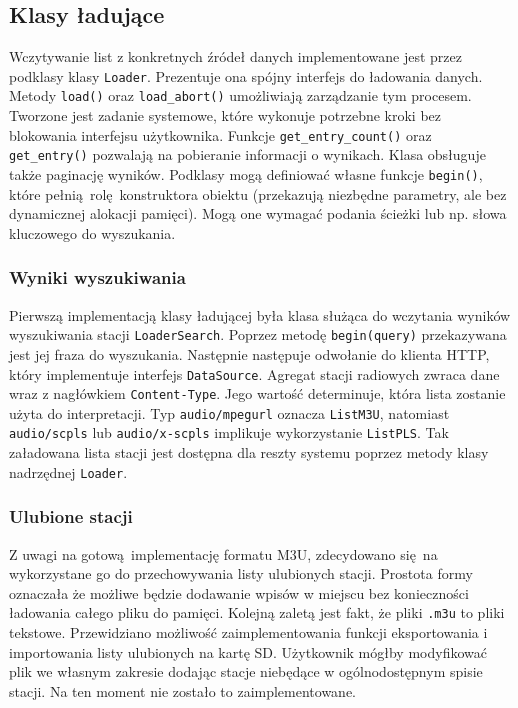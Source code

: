 \documentclass[polish]{aghengthesis}
\begin{document}
			
		\subsection{Klasy ładujące}
			Wczytywanie list z konkretnych źródeł danych implementowane jest przez podklasy klasy \lstinline|Loader|. Prezentuje ona spójny interfejs do ładowania danych. Metody \lstinline|load()| oraz \lstinline|load_abort()| umożliwiają zarządzanie tym procesem. Tworzone jest zadanie systemowe, które wykonuje potrzebne kroki bez blokowania interfejsu użytkownika. Funkcje \lstinline|get_entry_count()| oraz \lstinline|get_entry()| pozwalają na pobieranie informacji o wynikach. Klasa obsługuje także paginację wyników. Podklasy mogą definiować własne funkcje \lstinline|begin()|, które pełnią rolę konstruktora obiektu (przekazują niezbędne parametry, ale bez dynamicznej alokacji pamięci). Mogą one wymagać podania ścieżki lub np. słowa kluczowego do wyszukania.
			
			\subsubsection{Wyniki wyszukiwania}
				Pierwszą implementacją klasy ładującej była klasa służąca do wczytania wyników wyszukiwania stacji \lstinline|LoaderSearch|. Poprzez metodę \lstinline|begin(query)| przekazywana jest jej fraza do wyszukania. Następnie następuje odwołanie do klienta HTTP, który implementuje interfejs \lstinline|DataSource|. Agregat stacji radiowych zwraca dane wraz z nagłówkiem \lstinline|Content-Type|. Jego wartość determinuje, która lista zostanie użyta do interpretacji. Typ \lstinline|audio/mpegurl| oznacza \lstinline|ListM3U|, natomiast \lstinline|audio/scpls| lub \lstinline|audio/x-scpls| implikuje wykorzystanie \lstinline|ListPLS|. Tak załadowana lista stacji jest dostępna dla reszty systemu poprzez metody klasy nadrzędnej \lstinline|Loader|.
			
			\subsubsection{Ulubione stacji}
				Z uwagi na gotową implementację formatu M3U, zdecydowano się na wykorzystane go do przechowywania listy ulubionych stacji. Prostota formy oznaczała że możliwe będzie dodawanie wpisów w miejscu bez konieczności ładowania całego pliku do pamięci. Kolejną zaletą jest fakt, że pliki \lstinline|.m3u| to pliki tekstowe. Przewidziano możliwość zaimplementowania funkcji eksportowania i importowania listy ulubionych na kartę SD. Użytkownik mógłby modyfikować plik we własnym zakresie dodając stacje niebędące w ogólnodostępnym spisie stacji. Na ten moment nie zostało to zaimplementowane.
\end{document}

